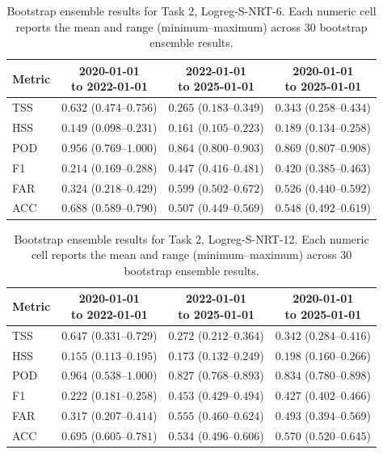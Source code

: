 \begin{table}[htbp]
\centering
\small
\caption{Bootstrap ensemble results for Task 2, Logreg-S-NRT-6. Each numeric cell reports the mean and range (minimum--maximum) across 30 bootstrap ensemble results.}
\label{tab:app-task2-logreg-s-nrt-6}
\begin{tabular}{lccc}
\toprule
Metric & \shortstack{2020-01-01\\to 2022-01-01} & \shortstack{2022-01-01\\to 2025-01-01} & \shortstack{2020-01-01\\to 2025-01-01} \\
\midrule
TSS & $0.632$ ($0.474$--$0.756$) & $0.265$ ($0.183$--$0.349$) & $0.343$ ($0.258$--$0.434$) \\
HSS & $0.149$ ($0.098$--$0.231$) & $0.161$ ($0.105$--$0.223$) & $0.189$ ($0.134$--$0.258$) \\
POD & $0.956$ ($0.769$--$1.000$) & $0.864$ ($0.800$--$0.903$) & $0.869$ ($0.807$--$0.908$) \\
F1 & $0.214$ ($0.169$--$0.288$) & $0.447$ ($0.416$--$0.481$) & $0.420$ ($0.385$--$0.463$) \\
FAR & $0.324$ ($0.218$--$0.429$) & $0.599$ ($0.502$--$0.672$) & $0.526$ ($0.440$--$0.592$) \\
ACC & $0.688$ ($0.589$--$0.790$) & $0.507$ ($0.449$--$0.569$) & $0.548$ ($0.492$--$0.619$) \\
\bottomrule
\end{tabular}
\end{table}
\clearpage

\begin{table}[htbp]
\centering
\small
\caption{Bootstrap ensemble results for Task 2, Logreg-S-NRT-12. Each numeric cell reports the mean and range (minimum--maximum) across 30 bootstrap ensemble results.}
\label{tab:app-task2-logreg-s-nrt-12}
\begin{tabular}{lccc}
\toprule
Metric & \shortstack{2020-01-01\\to 2022-01-01} & \shortstack{2022-01-01\\to 2025-01-01} & \shortstack{2020-01-01\\to 2025-01-01} \\
\midrule
TSS & $0.647$ ($0.331$--$0.729$) & $0.272$ ($0.212$--$0.364$) & $0.342$ ($0.284$--$0.416$) \\
HSS & $0.155$ ($0.113$--$0.195$) & $0.173$ ($0.132$--$0.249$) & $0.198$ ($0.160$--$0.266$) \\
POD & $0.964$ ($0.538$--$1.000$) & $0.827$ ($0.768$--$0.893$) & $0.834$ ($0.780$--$0.898$) \\
F1 & $0.222$ ($0.181$--$0.258$) & $0.453$ ($0.429$--$0.494$) & $0.427$ ($0.402$--$0.466$) \\
FAR & $0.317$ ($0.207$--$0.414$) & $0.555$ ($0.460$--$0.624$) & $0.493$ ($0.394$--$0.569$) \\
ACC & $0.695$ ($0.605$--$0.781$) & $0.534$ ($0.496$--$0.606$) & $0.570$ ($0.520$--$0.645$) \\
\bottomrule
\end{tabular}
\end{table}
\clearpage

